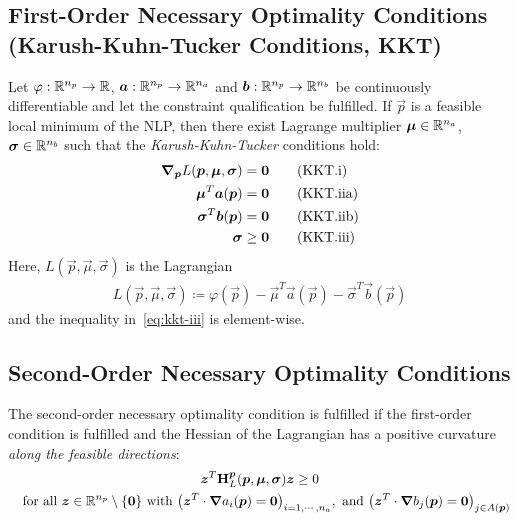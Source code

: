 		\subsection{First-Order Necessary Optimality Conditions (Karush-Kuhn-Tucker Conditions, KKT)}
			Let \( \varphi : \mathbb{R}^{n_p} \to \mathbb{R} \), \( \bm{a} : \mathbb{R}^{n_p} \to \mathbb{R}^{n_a} \) and \( \bm{b} : \mathbb{R}^{n_p} \to \mathbb{R}^{n_b} \) be continuously differentiable and let the constraint qualification be fulfilled. If \( \vec{p} \) is a feasible local minimum of the NLP, then there exist Lagrange multiplier \( \bm{\mu} \in \mathbb{R}^{n_a} \), \( \bm{\sigma} \in \mathbb{R}^{n_b} \) such that the \emph{Karush-Kuhn-Tucker} conditions hold:
			\begin{align}
				\grad_{\bm{p}}L(\bm{p}, \bm{\mu}, \bm{\sigma}) & = \bm{0}    \tag{KKT.i}                      \\
				\bm{\mu}^T \bm{a}(\bm{p})                       & = \bm{0}    \tag{KKT.iia}                    \\
				\bm{\sigma}^T \bm{b}(\bm{p})                    & = \bm{0}    \tag{KKT.iib}                    \\
				\bm{\sigma}                                       & \geq \bm{0} \tag{KKT.iii} \label{eq:kkt-iii}
			\end{align}
			Here, \( L(\vec{p}, \vec{\mu}, \vec{\sigma}) \) is the Lagrangian
			\begin{align*}
				L(\vec{p}, \vec{\mu}, \vec{\sigma}) \coloneqq \varphi(\vec{p}) - \vec{\mu}^T \vec{a}(\vec{p}) - \vec{\sigma}^T \vec{b}(\vec{p})
			\end{align*}
			and the inequality in~\eqref{eq:kkt-iii} is element-wise.

		\subsection{Second-Order Necessary Optimality Conditions}
			The second-order necessary optimality condition is fulfilled if the first-order condition is fulfilled and the Hessian of the Lagrangian has a positive curvature \emph{along the feasible directions}:
			\begin{gather*}
				\bm{z}^T \bm{\mathrm{H}}_L^{\bm{p}}(\bm{p}, \bm{\mu}, \bm{\sigma}) \bm{z} \geq 0 \\
				\quad\text{for all }
				\bm{z} \in \mathbb{R}^{n_p} \setminus \{\bm{0}\}
				\text{ with }
				\big( \bm{z}^T \cdot \grad{a_i}(\bm{p}) = \bm{0} \big)_{i = 1, \cdots, n_a},
				\text{ and }
				\big( \bm{z}^T \cdot \grad{b_j}(\bm{p}) = \bm{0} \big)_{j \in A(\bm{p})}
			\end{gather*}


